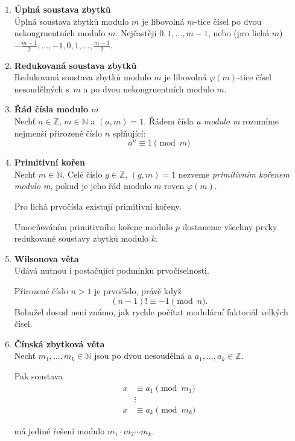 \documentclass[12pt,a4paper]{article}
\begin{document}
\begin{enumerate}[leftmargin=*]
	\item \textbf{Úplná soustava zbytků}\\
		Úplná soustava zbytků modulo $m$ je libovolná $m$-tice čísel po dvou
		nekongruentních modulo $m$. Nejčastěji $0, 1, \dots, m-1$, nebo
		(pro lichá $m$) $-\frac{m-1}{2}, \dots, -1, 0, 1, \dots, \frac{m-1}{2}$.

	\item \textbf{Redukovaná soustava zbytků}\\
		Redukovaná soustava zbytků modulo $m$ je libovolná $\varphi(m)$-tice
		čísel nesoudělných s~$m$ a po dvou nekongruentních modulo $m$.

	\item \textbf{Řád čísla modulo $m$}\\
		Nechť $a \in \mathbb{Z}$, $m \in \mathbb{N}$ a $(a,m) = 1$. Řádem čísla
		\textit{a modulo m} rozumíme nejmenší přirozené číslo $n$ splňující:
		\[ a^n \equiv 1 \pmod{m} \]

	\item \textbf{Primitivní kořen}\\
		Nechť $m \in \mathbb{N}$. Celé číslo $g \in \mathbb{Z}$, $(g,m) = 1$
		nezveme \textit{primitivním kořenem modulo m}, pokud je jeho řád modulo
		$m$ roven $\varphi(m)$.

		Pro lichá prvočísla existují primitivní kořeny.

		Umocňováním primitivního kořene modulo $p$ dostaneme všechny prvky
		redukované soustavy zbytků modulo $k$.

	\item \textbf{Wilsonova věta}\\
		Udává nutnou i postačující podmínku prvočíselnosti.

		Přirozené číslo $n > 1$ je prvočíslo, právě když
		\[ (n-1)! \equiv -1 \pmod{n}. \]
		Bohužel dosud není známo, jak rychle počítat modulární faktoriál velkých
		čísel.

	\item \textbf{Čínská zbytková věta}\\
		Nechť $m_1, \ldots, m_k \in \mathbb{N}$ jsou po dvou nesoudělná a
		$a_1, \ldots, a_k \in \mathbb{Z}$.

		Pak soustava
		\begin{align*}
			x &\equiv a_1 \pmod{m_1}\\
			&\vdots\\
			x &\equiv a_k \pmod{m_k}
		\end{align*}

		má jediné řešení modulo $m_1 \cdot m_2 \cdots m_k$.


\end{enumerate}
\end{document}
